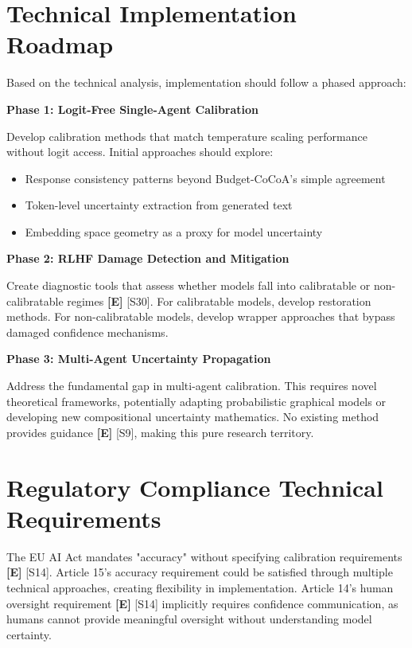 \documentclass[a4paper,11pt]{article}
\newcommand{\elabel}{\textbf{\textcolor{ecolor}{[E]}}}
\begin{document}
\section{Technical Implementation Roadmap}

Based on the technical analysis, implementation should follow a phased approach:


\textbf{Phase 1: Logit-Free Single-Agent Calibration}\par
Develop calibration methods that match temperature scaling performance without logit access. Initial approaches should explore:

\begin{itemize}
  \item Response consistency patterns beyond Budget-CoCoA's simple agreement
  \item Token-level uncertainty extraction from generated text
  \item Embedding space geometry as a proxy for model uncertainty
\end{itemize}

\textbf{Phase 2: RLHF Damage Detection and Mitigation}\par
Create diagnostic tools that assess whether models fall into calibratable or non-calibratable regimes \elabel{} \textcolor{primary}{[S30]}. For calibratable models, develop restoration methods. For non-calibratable models, develop wrapper approaches that bypass damaged confidence mechanisms.


\textbf{Phase 3: Multi-Agent Uncertainty Propagation}\par
Address the fundamental gap in multi-agent calibration. This requires novel theoretical frameworks, potentially adapting probabilistic graphical models or developing new compositional uncertainty mathematics. No existing method provides guidance \elabel{} \textcolor{primary}{[S9]}, making this pure research territory.


\section{Regulatory Compliance Technical Requirements}

The EU AI Act mandates "accuracy" without specifying calibration requirements \elabel{} \textcolor{primary}{[S14]}. Article 15's accuracy requirement could be satisfied through multiple technical approaches, creating flexibility in implementation. Article 14's human oversight requirement \elabel{} \textcolor{primary}{[S14]} implicitly requires confidence communication, as humans cannot provide meaningful oversight without understanding model certainty.
\end{document}
